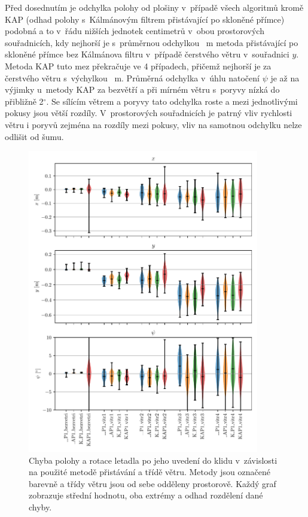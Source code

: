     Před dosednutím je odchylka polohy od plošiny v~případě všech algoritmů kromě KAP (odhad polohy s~Kálmánovým filtrem přistávající po skloněné přímce) podobná a to v~řádu nižších jednotek centimetrů v~obou prostorových souřadnicích, kdy nejhorší je s~průměrnou odchylkou \mistoPredPristaniYmeanLAPILvitrIII~m metoda přistávající po skloněné přímce bez Kálmánova filtru v~případě čerstvého větru v~souřadnici $y$. Metoda KAP tuto mez překračuje ve 4 případech, přičemž nejhorší je za čerstvého větru s~výchylkou \mistoPredPristaniYmeanKAPILvitrIII~m. Průměrná odchylka v~úhlu natočení $\psi$ je až na výjimky u~metody KAP za bezvětří a při mírném větru s~poryvy nízká do přibližně 2$^\circ$. Se sílícím větrem a poryvy tato odchylka roste a mezi jednotlivými pokusy jsou větší rozdíly. V~prostorových souřadnicích je patrný vliv rychlosti větru i poryvů zejména na rozdíly mezi pokusy, vliv na samotnou odchylku nelze odlišit od šumu.

    \begin{figure}[H]
      \centering
      \includegraphics[width=0.9\textwidth]{img/results/presnostPristani.pdf}
      \caption[Chyba přistání]{Chyba polohy a rotace letadla po jeho uvedení do klidu v~závislosti na použité metodě přistávání a třídě větru. Metody jsou označené barevně a třídy větru jsou od sebe odděleny prostorově. Každý graf zobrazuje střední hodnotu, oba extrémy a odhad rozdělení dané chyby.}
      \label{fig:pristaniViolin}
    \end{figure}

